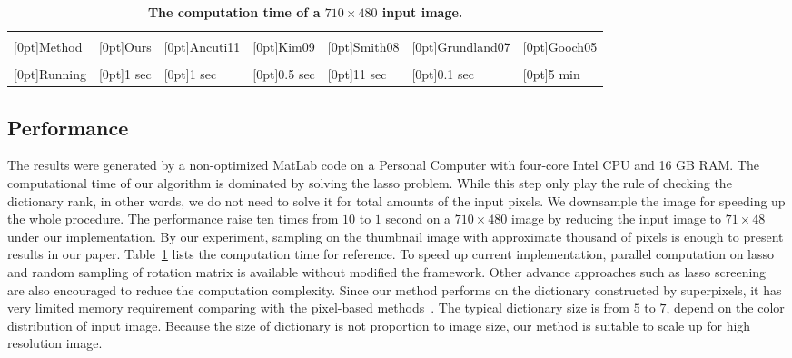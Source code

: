 \newcommand{\sfont}{\scriptsize}
\newcommand{\rb}[1]{\raisebox{1.0ex}[0pt]{#1}}
\begin{table}[t]{\tiny
\caption{\textbf{The computation time of a $710\times480$ input image.}} 
\begin{center}{\sfont
\begin{tabular}{|>{\centering}p{1cm}|>{\centering}p{1cm}|>{\centering}p{1cm}|>{\centering}p{1cm}|>{\centering}p{1cm}|>{\centering}p{1.1cm}|p{1cm}<{\centering}|} \hline%
              &             &               &              &              &                  &          \\%
\rb{Method}   &  \rb{Ours}  & \rb{Ancuti11} & \rb{Kim09}   & \rb{Smith08} & \rb{Grundland07} &  \rb{Gooch05} \\ \hline %
              &             &               &              &              &                  &          \\%
\rb{Running}  &  \rb{1 sec} & \rb{1 sec}    & \rb{0.5 sec} & \rb{11 sec}  & \rb{0.1 sec}     &  \rb{5 min}   \\ \hline %
\end{tabular}}
\end{center}
\label{tbl:performance}}
\end{table}

\subsection{Performance}
\label{sec:performance}
The results were generated by a non-optimized MatLab code on a Personal Computer 
with four-core Intel CPU and 16 GB RAM.
The computational time of our algorithm is dominated by solving the lasso problem.
While this step only play the rule of checking the dictionary rank, in other words,
we do not need to solve it for total amounts of the input pixels.
We downsample the image for speeding up the whole procedure.
The performance raise ten times from $10$ to $1$ second on a $710\times480$ image by
reducing the input image to $71\times48$ under our implementation.
By our experiment, sampling on the thumbnail image with approximate thousand of pixels
is enough to present results in our paper.
Table~\ref{tbl:performance} lists the computation time for reference.
To speed up current implementation, parallel computation on lasso and random sampling
of rotation matrix is available without modified the framework.
Other advance approaches such as lasso screening~\cite{Xiang:2011:LSP} are also
encouraged to reduce the computation complexity. 
Since our method performs on the dictionary constructed by superpixels, 
it has very limited memory requirement comparing with 
the pixel-based methods~\cite{Gooch:2005:CSC}.
The typical dictionary size is from $5$ to $7$, depend on the color distribution of 
input image.
Because the size of dictionary is not proportion to image size, 
our method is suitable to scale up for high resolution image.
